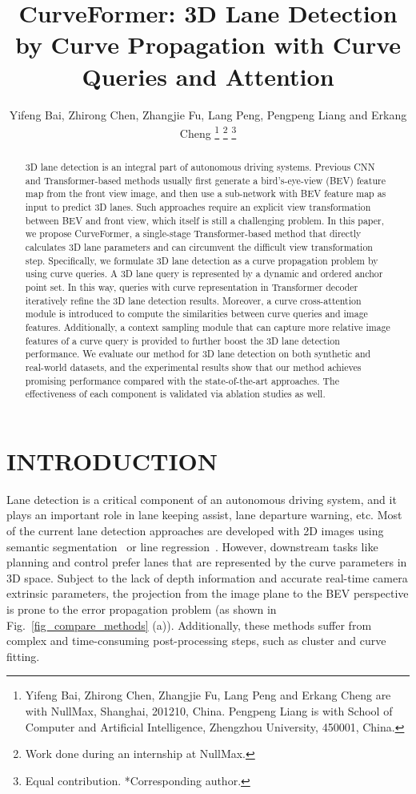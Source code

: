 \documentclass[letterpaper, 10 pt, conference]{ieeeconf}
\title{\LARGE \bf
CurveFormer: 3D Lane Detection by Curve Propagation with Curve Queries and Attention
}
\author{Yifeng Bai, Zhirong Chen, Zhangjie Fu, Lang Peng, Pengpeng Liang and Erkang Cheng \thanks{Yifeng Bai, Zhirong Chen, Zhangjie Fu, Lang Peng and Erkang Cheng are with NullMax, Shanghai, 201210, China. Pengpeng Liang is with School of Computer and Artificial Intelligence, Zhengzhou University, 450001, China.}
	\thanks{ Work done during an internship at NullMax.}
	\thanks{ Equal contribution. *Corresponding author.}
}
\begin{document}
\maketitle
\thispagestyle{empty}
\pagestyle{empty}


\begin{abstract}
3D lane detection is an integral part of autonomous driving systems. Previous CNN and Transformer-based methods usually first generate a bird's-eye-view (BEV) feature map from the front view image, and then use a sub-network with BEV feature map as input to predict 3D lanes. Such approaches require an explicit view transformation between BEV and front view, which itself is still a challenging problem. In this paper, we propose CurveFormer, a single-stage Transformer-based method that directly calculates 3D lane parameters and can circumvent the difficult view transformation step. Specifically, we formulate 3D lane detection as a curve propagation problem by using curve queries. A 3D lane query is represented by a dynamic and ordered anchor point set. In this way, queries with curve representation in Transformer decoder iteratively refine the 3D lane detection results. Moreover, a curve cross-attention module is introduced to compute the similarities between curve queries and image features. Additionally, a context sampling module that can capture more relative image features of a curve query is provided to further boost the 3D lane detection performance. We evaluate our method for 3D lane detection on both synthetic and real-world datasets, and the experimental results show that our method achieves promising performance compared with the state-of-the-art approaches. The effectiveness of each component is validated via ablation studies as well.
\end{abstract}

\section{INTRODUCTION}
Lane detection is a critical component of an autonomous driving system, and it plays an important role in lane keeping assist, lane departure warning, etc. Most of the current lane detection approaches are developed with 2D images using semantic segmentation~\cite{pan2017spatial, neven2018towards, hou2019learning, zheng2020resa} or line regression~\cite{ko2020key, wang2022keypoint, chen2019pointlanenet, li2020curvelane, li2019line, 2020Keep, zheng2022clrnet, qin2020ultra}. However, downstream tasks like planning and control prefer lanes that are represented by the curve parameters in 3D space. Subject to the lack of depth information and accurate real-time camera extrinsic parameters, the projection from the image plane to the BEV perspective is prone to the error propagation problem
(as shown in Fig.~\ref{fig_compare_methods} (a)). Additionally, these methods suffer from complex and time-consuming post-processing steps, such as cluster and curve fitting. 
\end{document}
